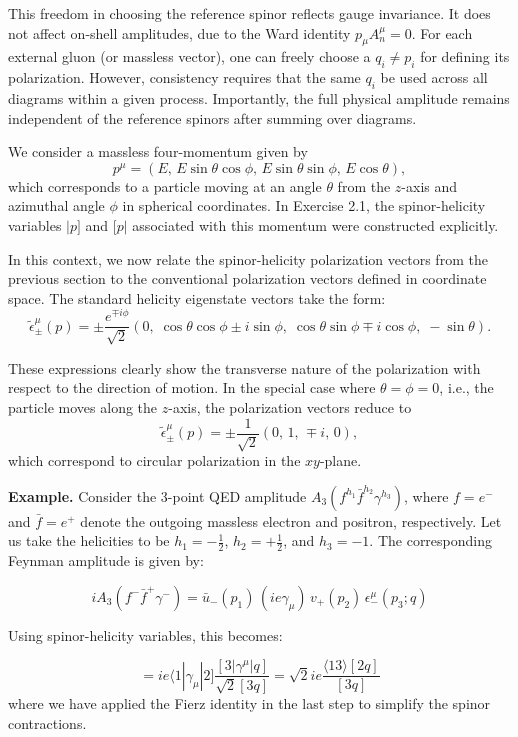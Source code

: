 \documentclass[12pt]{article}
\numberwithin{equation}{section}
\newcommand{\sket}[1]{|#1]}
\newcommand{\bra}[1]{\langle #1|}
\begin{document}
This freedom in choosing the reference spinor reflects gauge invariance. It does not affect on-shell amplitudes, due to the Ward identity \( p_\mu A_n^\mu = 0 \). For each external gluon (or massless vector), 
one can freely choose a \( q_i \neq p_i \) for defining its polarization. However, consistency requires that the same \( q_i \) be used across all diagrams within a given process. Importantly, the full physical amplitude remains independent of the reference spinors after summing over diagrams.

We consider a massless four-momentum given by
\[
p^\mu = \left( E,\, E \sin\theta \cos\phi,\, E \sin\theta \sin\phi,\, E \cos\theta \right),
\]
which corresponds to a particle moving at an angle \(\theta\) from the \(z\)-axis and azimuthal angle \(\phi\) in spherical coordinates. In Exercise 2.1, the spinor-helicity variables \(\sket{p}\) and \([p|\) associated with this momentum were constructed explicitly.

In this context, we now relate the spinor-helicity polarization vectors from the previous section to the conventional polarization vectors defined in coordinate space. The standard helicity eigenstate vectors take the form:
\[
\tilde{\epsilon}_\pm^\mu(p) = \pm \frac{e^{\mp i\phi}}{\sqrt{2}}
\left( 0,\; \cos\theta \cos\phi \pm i \sin\phi,\; \cos\theta \sin\phi \mp i \cos\phi,\; -\sin\theta \right).
\]

These expressions clearly show the transverse nature of the polarization with respect to the direction of motion. In the special case where \(\theta = \phi = 0\), i.e., the particle moves along the \(z\)-axis, the polarization vectors reduce to
\[
\tilde{\epsilon}_\pm^\mu(p) = \pm \frac{1}{\sqrt{2}}(0,\, 1,\, \mp i,\, 0),
\]
which correspond to circular polarization in the \(xy\)-plane.

\textbf{Example.} Consider the 3-point QED amplitude \( A_3(f^{h_1} \bar{f}^{h_2} \gamma^{h_3}) \), where \( f = e^- \) and \( \bar{f} = e^+ \) denote the outgoing massless electron and positron, respectively. Let us take the helicities to be \( h_1 = -\tfrac{1}{2} \), \( h_2 = +\tfrac{1}{2} \), and \( h_3 = -1 \). The corresponding Feynman amplitude is given by:

\[
i A_3(f^- \bar{f}^+ \gamma^-) = \bar{u}_-(p_1) \, (ie \gamma_\mu) \, v_+(p_2) \, \epsilon_-^\mu(p_3; q)
\]

Using spinor-helicity variables, this becomes:

\[
= ie \bra{1} \gamma_\mu \sket{2}  \frac{ [3| \gamma^\mu \sket{q} }{ \sqrt{2} [3 q] }
= \sqrt{2} i e \frac{ \langle 13 \rangle [2 q] }{ [3 q] }
\]
where we have applied the Fierz identity in the last step to simplify the spinor contractions.
\end{document}
